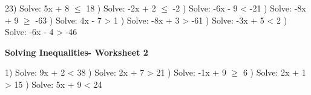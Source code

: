 \documentclass{article}%
\begin{document}
23) Solve: 5x + 8 $\leq$ 18%
\newline%
\newline%
) Solve: -2x + 2 $\leq$ -2%
\newline%
\newline%
) Solve: -6x - 9 < -21%
\newline%
\newline%
) Solve: -8x + 9 $\geq$ -63%
\newline%
\newline%
) Solve: 4x - 7 > 1%
\newline%
\newline%
) Solve: -8x + 3 > -61%
\newline%
\newline%
) Solve: -3x + 5 < 2%
\newline%
\newline%
) Solve: -6x - 4 > -46%
\newline%
\newline%
\newline%
\pagebreak%
\large%
\begin{center}%
\textbf{Solving Inequalities- Worksheet 2}%
\newline%
\newline%
\newline%
\end{center} \normalsize%
1) Solve: 9x + 2 < 38%
\newline%
\newline%
) Solve: 2x + 7 > 21%
\newline%
\newline%
) Solve: -1x + 9 $\geq$ 6%
\newline%
\newline%
) Solve: 2x + 1 > 15%
\newline%
\newline%
) Solve: 5x + 9 < 24%
\newline%
\newline%
\newline%
\end{document}
